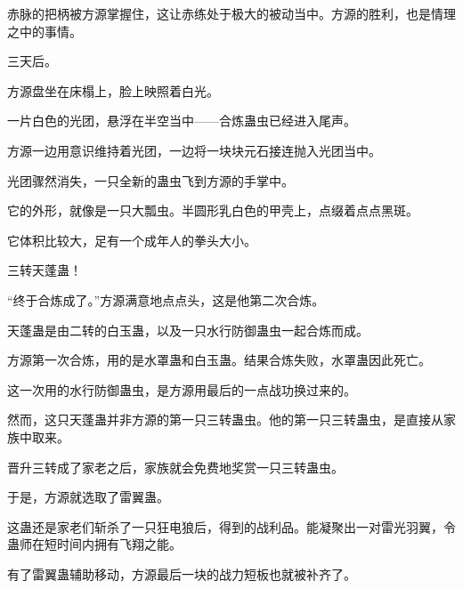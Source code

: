 \begin{this_body}
赤脉的把柄被方源掌握住，这让赤练处于极大的被动当中。方源的胜利，也是情理之中的事情。

三天后。

方源盘坐在床榻上，脸上映照着白光。

一片白色的光团，悬浮在半空当中——合炼蛊虫已经进入尾声。

方源一边用意识维持着光团，一边将一块块元石接连抛入光团当中。

光团骤然消失，一只全新的蛊虫飞到方源的手掌中。

它的外形，就像是一只大瓢虫。半圆形乳白色的甲壳上，点缀着点点黑斑。

它体积比较大，足有一个成年人的拳头大小。

三转天蓬蛊！

“终于合炼成了。”方源满意地点点头，这是他第二次合炼。

天蓬蛊是由二转的白玉蛊，以及一只水行防御蛊虫一起合炼而成。

方源第一次合炼，用的是水罩蛊和白玉蛊。结果合炼失败，水罩蛊因此死亡。

这一次用的水行防御蛊虫，是方源用最后的一点战功换过来的。

然而，这只天蓬蛊并非方源的第一只三转蛊虫。他的第一只三转蛊虫，是直接从家族中取来。

晋升三转成了家老之后，家族就会免费地奖赏一只三转蛊虫。

于是，方源就选取了雷翼蛊。

这蛊还是家老们斩杀了一只狂电狼后，得到的战利品。能凝聚出一对雷光羽翼，令蛊师在短时间内拥有飞翔之能。

有了雷翼蛊辅助移动，方源最后一块的战力短板也就被补齐了。

\end{this_body}

